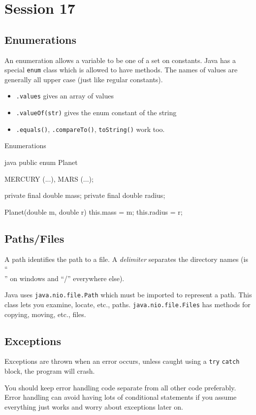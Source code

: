 \section{Session 17}\label{sec:session_17}

\subsection{Enumerations}\label{sub:enumerations}

An enumeration allows a variable to be one of a set on constants.
Java has a special \texttt{enum} class which is allowed to have methods.
The names of values are generally all upper case (just like regular constants).

\begin{itemize}
	\item \texttt{.values} gives an array of values
	\item \texttt{.valueOf(str)} gives the enum constant of the string
	\item \texttt{.equals()}, \texttt{.compareTo()}, \texttt{toString()} work too.
\end{itemize}

\begin{highlight}{Enumerations}
	\begin{code}{java}
		public enum Planet {
            MERCURY (...),
            MARS (...);

            private final double mass;
            private final double radius;

            Planet(double m, double r) {
                this.mass = m;
                this.radius = r;
            }
        }
	\end{code}
\end{highlight}

\subsection{Paths/Files}\label{sub:paths_files}

A path identifies the path to a file.
A \emph{delimiter} separates the directory names (is ``\\'' on windows and ``/'' everywhere else).

Java uses \texttt{java.nio.file.Path} which must be imported to represent a path.
This class lets you examine, locate, etc., paths.
\texttt{java.nio.file.Files} has methods for copying, moving, etc., files.

\subsection{Exceptions}\label{sub:exceptions}

Exceptions are thrown when an error occurs, unless caught using a \texttt{try} \texttt{catch} block, the program will crash.

You should keep error handling code separate from all other code preferably.
Error handling can avoid having lots of conditional statements if you assume everything just works and worry about exceptions later on.
